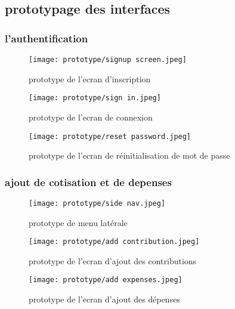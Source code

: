 \subsection{prototypage des interfaces}
\subsubsection{l'authentification}
\begin{figure}[!htbp]
\begin{minipage}[t]{0.25\textwidth}    %
        \texttt{[image: prototype/signup screen.jpeg]}
        \caption{ prototype de l'ecran d'inscription}
  \end{minipage}%
  \begin{minipage}{0.10\textwidth}
    \hfill
  \end{minipage}
\begin{minipage}[t]{0.25\textwidth}
        \texttt{[image: prototype/sign in.jpeg]}
        \caption{ prototype de l'ecran de connexion}
\end{minipage}%
\begin{minipage}{0.10\textwidth}
    \hfill
\end{minipage}
  \begin{minipage}[t]{0.25\textwidth}
        \texttt{[image: prototype/reset password.jpeg]}
        \caption{ prototype de l'ecran de réinitialisation de mot de passe}
\end{minipage}
\end{figure}
\newpage
\subsubsection{ajout de cotisation et de depenses}
\begin{figure}[h]
    \begin{minipage}[t]{0.25\textwidth}    %
            \texttt{[image: prototype/side nav.jpeg]}
            \caption{ prototype de menu latérale}
      \end{minipage}%
      \begin{minipage}{0.10\textwidth}
        \hfill
      \end{minipage}
    \begin{minipage}[t]{0.25\textwidth}
            \texttt{[image: prototype/add contribution.jpeg]}
            \caption{ prototype de l'ecran d'ajout des contributions}
    \end{minipage}%
    \begin{minipage}{0.10\textwidth}
        \hfill
    \end{minipage}
      \begin{minipage}[t]{0.25\textwidth}
            \texttt{[image: prototype/add expenses.jpeg]}
            \caption{ prototype de l'ecran d'ajout des dépenses}
    \end{minipage}
    \end{figure}
    \newpage
